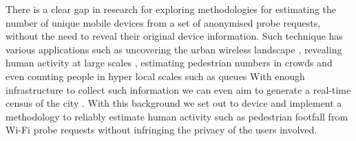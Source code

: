 There is a clear gap in research for exploring methodologies for estimating the number of unique mobile devices from a set of anonymised probe requests, without the need to reveal their original device information.
Such technique has various applications such as uncovering the urban wireless landscape \citep{rose2010mapping}, revealing human activity at large scales \citep{qin2013discovering}, estimating pedestrian numbers in crowds \citep{schauer2014estimating,fukuzaki2015statistical} and even counting people in hyper local scales such as queues \citep{wang2013measuring}
With enough infrastructure to collect such information we can even aim to generate a real-time census of the city \citep{konto2017}.
With this background we set out to device and implement a methodology to reliably estimate human activity such as pedestrian footfall from Wi-Fi probe requests without infringing the privacy of the users involved.
